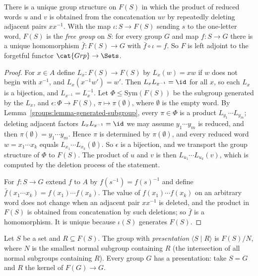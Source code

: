 \begin{theorem}\label{groups:theorem-free-group}
There is a unique group structure on $F(S)$ in which the product of reduced words
$u$ and $v$ is obtained from the concatenation $uv$ by repeatedly deleting adjacent
pairs $x x^{-1}$. With the map $\iota \colon S \to F(S)$ sending $s$ to the one-letter
word, $F(S)$ is the \emph{free group} on $S$: for every group $G$ and map
$f \colon S \to G$ there is a unique homomorphism $\bar f \colon F(S) \to G$ with
$\bar f \circ \iota = f$. So $F$ is left adjoint to the forgetful functor
$\cat{Grp} \to \Sets$.
\end{theorem}

\begin{proof}
For $x \in A$ define $L_x \colon F(S) \to F(S)$ by $L_x(w) = xw$ if $w$ does not begin
with $x^{-1}$, and $L_x(x^{-1}w') = w'$. Then $L_x L_{x^{-1}} = \id$ for all $x$, so each
$L_x$ is a bijection, and $L_{x^{-1}} = L_x^{-1}$. Let $\Phi \leq \mathrm{Sym}(F(S))$ be the
subgroup generated by the $L_x$, and $\epsilon \colon \Phi \to F(S)$, $\pi \mapsto \pi(\emptyset)$,
where $\emptyset$ is the empty word. By Lemma~\ref{groups:lemma-generated-subgroup}, every
$\pi \in \Phi$ is a product $L_{y_1} \cdots L_{y_m}$; deleting adjacent factors
$L_x L_{x^{-1}} = \id$ we may assume $y_1 \cdots y_m$ is reduced, and then
$\pi(\emptyset) = y_1 \cdots y_m$. Hence $\pi$ is determined by $\pi(\emptyset)$, and every reduced
word $w = x_1 \cdots x_k$ equals $L_{x_1} \cdots L_{x_k}(\emptyset)$. So $\epsilon$ is a bijection, and we
transport the group structure of $\Phi$ to $F(S)$. The product of $u$ and $v$ is then
$L_{u_1} \cdots L_{u_k}(v)$, which is computed by the deletion process of the
statement.

For $f \colon S \to G$ extend $f$ to $A$ by $f(s^{-1}) = f(s)^{-1}$ and define
$\bar f(x_1 \cdots x_k) = f(x_1) \cdots f(x_k)$. The value of $f(x_1)\cdots f(x_k)$ on an
arbitrary word does not change when an adjacent pair $x x^{-1}$ is deleted, and the
product in $F(S)$ is obtained from concatenation by such deletions; so $\bar f$ is a
homomorphism. It is unique because $\iota(S)$ generates $F(S)$.
\end{proof}

\begin{definition}\label{groups:definition-presentation}
Let $S$ be a set and $R \subseteq F(S)$. The group with \emph{presentation}
$\langle S \mid R \rangle$ is $F(S)/N$, where $N$ is the smallest normal subgroup containing $R$
(the intersection of all normal subgroups containing $R$). Every group $G$ has a
presentation: take $S = G$ and $R$ the kernel of $F(G) \to G$.
\end{definition}


